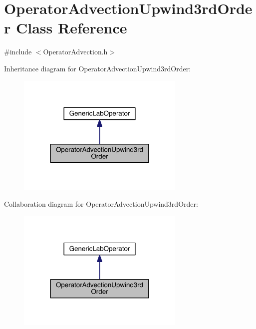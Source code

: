 \hypertarget{class_operator_advection_upwind3rd_order}{}\section{Operator\+Advection\+Upwind3rd\+Order Class Reference}
\label{class_operator_advection_upwind3rd_order}


{\ttfamily \#include $<$Operator\+Advection.\+h$>$}



Inheritance diagram for Operator\+Advection\+Upwind3rd\+Order\+:\nopagebreak
\begin{figure}[H]
\begin{center}
\leavevmode
\includegraphics[width=227pt]{d2/d48/class_operator_advection_upwind3rd_order__inherit__graph}
\end{center}
\end{figure}


Collaboration diagram for Operator\+Advection\+Upwind3rd\+Order\+:\nopagebreak
\begin{figure}[H]
\begin{center}
\leavevmode
\includegraphics[width=227pt]{d0/d46/class_operator_advection_upwind3rd_order__coll__graph}
\end{center}
\end{figure}
